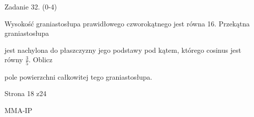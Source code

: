 \documentclass[a4paper,12pt]{article}
\begin{document}
Zadanie 32. (0-4)

Wysokość graniastosłupa prawidłowego czworokątnego jest równa 16. Przekątna graniastosłupa

jest nachylona do płaszczyzny jego podstawy pod kątem, którego cosinus jest równy $\displaystyle \frac{3}{5}$. Oblicz

pole powierzchni całkowitej tego graniastosłupa.

Strona 18 z24

MMA-IP
\end{document}
